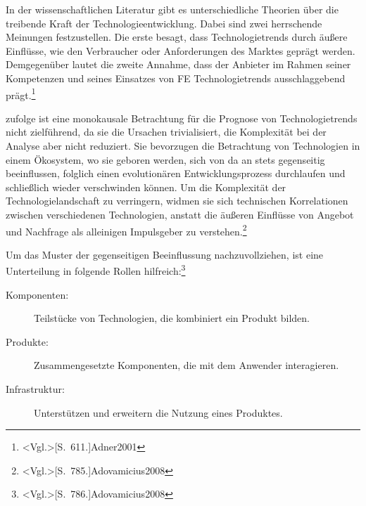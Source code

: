 In der wissenschaftlichen Literatur gibt es unterschiedliche Theorien über die treibende Kraft der Technologieentwicklung. Dabei sind zwei herrschende Meinungen festzustellen. Die erste besagt, dass Technologietrends durch äußere Einflüsse, wie den Verbraucher oder Anforderungen des Marktes geprägt werden. Demgegenüber lautet die zweite Annahme, dass der Anbieter im Rahmen seiner Kompetenzen und seines Einsatzes von \ac{FE} Technologietrends ausschlaggebend prägt.\footnote{\citeNP<Vgl.>[S.~611.]{Adner2001}}

 zufolge ist eine monokausale Betrachtung für die Prognose von Technologietrends nicht zielführend, da sie die Ursachen trivialisiert, die Komplexität bei der Analyse aber nicht reduziert. Sie bevorzugen die Betrachtung von Technologien in einem Ökosystem, wo sie geboren werden, sich von da an stets gegenseitig beeinflussen, folglich einen evolutionären Entwicklungsprozess durchlaufen und schließlich wieder verschwinden können. Um die Komplexität der Technologielandschaft zu verringern, widmen sie sich technischen Korrelationen zwischen verschiedenen Technologien, anstatt die äußeren Einflüsse von Angebot und Nachfrage als alleinigen Impulsgeber zu verstehen.\footnote{\citeNP<Vgl.>[S.~785.]{Adovamicius2008}}

Um das Muster der gegenseitigen Beeinflussung nachzuvollziehen, ist eine Unterteilung in folgende Rollen hilfreich:\footnote{\citeNP<Vgl.>[S.~786.]{Adovamicius2008}}
\begin{description}
	\item[Komponenten:] Teilstücke von Technologien, die kombiniert ein Produkt bilden.
	\item[Produkte:] Zusammengesetzte Komponenten, die mit dem Anwender interagieren.
	\item[Infrastruktur:] Unterstützen und erweitern die Nutzung eines Produktes.
\end{description}

%

